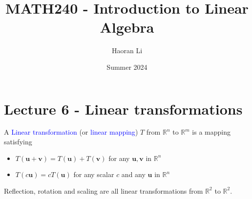\documentclass{beamer}
\title{MATH240 - Introduction to Linear Algebra}
\author{Haoran Li}
\institute[UMD]{University of Maryland, College Park}
\date{Summer 2024}
\theoremstyle{definition}
\theoremstyle{remark}
\begin{document}
\maketitle

\section{Lecture 6 - Linear transformations}

\begin{frame}[t]
\begin{definition}
A \textcolor{blue}{Linear transformation} (or \textcolor{blue}{linear mapping}) $T$ from $\mathbb R^n$ to $\mathbb R^m$ is a mapping satisfying\pause
\begin{itemize}
\item $T(\mathbf u+\mathbf v)=T(\mathbf u)+T(\mathbf v)$ for any $\mathbf u,\mathbf v$ in $\mathbb R^n$
\item $T(c\mathbf u)=cT(\mathbf u)$ for any scalar $c$ and any $\mathbf u$ in $\mathbb R^n$
\end{itemize}
\end{definition}
\pause
\begin{example}
Reflection, rotation and scaling are all linear transformations from $\mathbb R^2$ to $\mathbb R^2$.
\end{example}
\end{frame}
\end{document}
